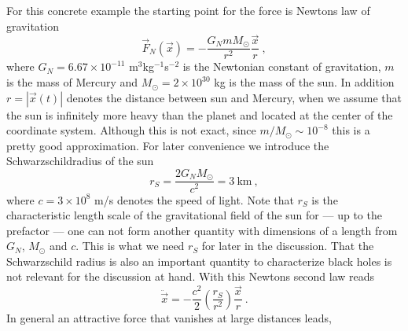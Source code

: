 \documentclass[12pt]{iopart}
\begin{document}
For this concrete example the starting point for the force is Newtons law
of gravitation
\begin{equation}
\vec F_N(\vec x) = - \frac{G_N m M_\odot}{r^2} \frac{\vec x}{r}\ ,
\end{equation}
where $G_N=6.67\times 10^{-11}$ m$^3$kg$^{-1}$s$^{-2}$ is the Newtonian constant of gravitation,
$m$ is the mass of Mercury and $M_\odot=2\times 10^{30}$ kg is the mass of the sun.
In addition $r=|\vec x(t)|$ denotes the distance between sun and Mercury, when we assume that the sun
is infinitely more heavy than the planet and located at the center of the coordinate system. 
Although this is not exact, since $m/M_\odot\sim 10^{-8}$ this is a pretty good approximation.
%
%
For later convenience we introduce the Schwarzschildradius of the sun
\begin{equation}
r_S=\frac{2G_N  M_\odot}{c^2} = 3 \ \mbox{km} \ ,
\end{equation}
where $c=3\times 10^8$ m/s denotes the speed of light.
Note that $r_S$ is the characteristic length scale of the gravitational field of the sun
for --- up to the prefactor --- one can not form another quantity with dimensions of a length from $G_N$, $M_\odot$ and
$c$. This is what we need $r_S$ for later in the discussion. That the Schwarzschild radius is
also an important quantity to characterize black holes is not relevant for the discussion
at hand.
With this Newtons second law reads 
\begin{equation}
\ddot{\vec x} = - \frac{c^2}{2}\left(\frac{r_S}{r^2}\right) \frac{\vec{x}}{r} \ .
\label{eq:newton}
\end{equation}
In general an attractive force that vanishes at large distances leads,
\end{document}
